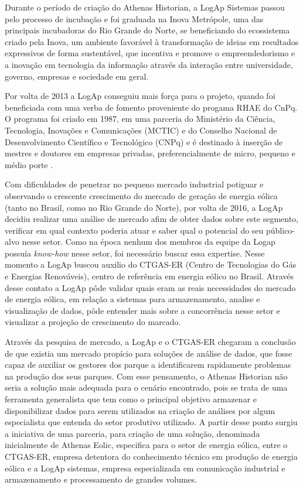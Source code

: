 Durante o período de criação do Athenas Historian, a LogAp Sistemas passou pelo processo de incubação e foi graduada na Inova Metrópole, uma das principais incubadoras do Rio Grande do Norte, se beneficiando do ecossistema criado pela Inova, um ambiente favorável à transformação de ideias em resultados expressivos de forma sustentável, que incentiva e promove o empreendedorismo e a inovação em tecnologia da informação através da interação entre universidade, governo, empresas e sociedade em geral.

Por volta de 2013 a LogAp conseguiu mais força para o projeto, quando foi beneficiada com uma verba de fomento proveniente do progama RHAE do CnPq. O programa foi criado em 1987, em uma parceria do Ministério da Ciência, Tecnologia, Inovações e Comunicações (MCTIC) e do Conselho Nacional de Desenvolvimento Científico e Tecnológico (CNPq) e é destinado à inserção de mestres e doutores em empresas privadas, preferencialmente de micro, pequeno e médio porte \cite{RHAE}.

Com dificuldades de penetrar no pequeno mercado industrial potiguar e observando o crescente crescimento do mercado de geração de energia eólica (tanto no Brasil, como no Rio Grande do Norte), por volta de 2016, a LogAp decidiu realizar uma análise de mercado afim de obter dados sobre este segmento, verificar em qual contexto poderia atuar e saber qual o potencial do seu público-alvo nesse setor. Como na época nenhum dos membros da equipe da Logap possuía \textit{know-how} nesse setor, foi necessário buscar essa expertise. Nesse momento a LogAp buscou auxilio do CTGAS-ER (Centro de Tecnologias do Gás e Energias Renováveis), centro de referência em energia eólico no Brasil. Através desse contato a LogAp pôde validar quais eram as reais necessidades do mercado de energia eólica, em relação a sistemas para armazenamento, analise e visualização de dados, pôde entender mais sobre a concorrência nesse setor e visualizar a projeção de crescimento do marcado.

Através da pesquisa de mercado, a LogAp e o CTGAS-ER chegaram a conclusão de que existia um mercado propício para soluções de análise de dados, que fosse capaz de auxiliar os gestores dos parque a identificarem rapidamente problemas na produção dos seus parques. Com esse pensamento, o Athenas Historian não seria a solução mais adequada para o cenário encontrado, pois se trata de uma ferramenta generalista que tem como o principal objetivo armazenar e disponibilizar dados para serem utilizados na criação de análises por algum especialista que entenda do setor produtivo utilizado. A partir desse ponto surgiu a iniciativa de uma parceria, para criação de uma solução, denominada inicialmente de Athenas Eolic, especifica para o setor de energia eólica, entre o CTGAS-ER, empresa detentora do conhecimento técnico em produção de energia eólica e a LogAp sistemas, empresa especializada em comunicação industrial e armazenamento e processamento de grandes volumes.

